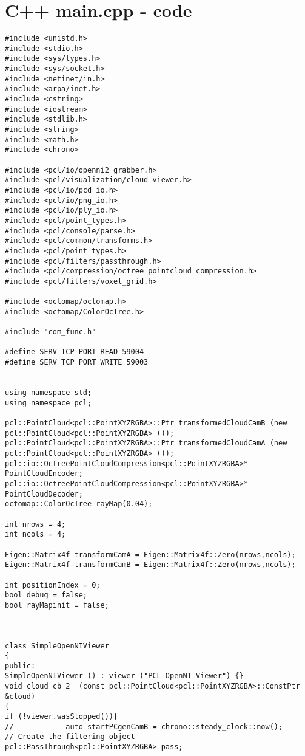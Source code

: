 \chapter{C++ main.cpp - code}
\label{app:main.cpp}


\begin{lstlisting}[frame = single, label={lst:cppread1}]
#include <unistd.h>
#include <stdio.h>
#include <sys/types.h>
#include <sys/socket.h>
#include <netinet/in.h>
#include <arpa/inet.h>
#include <cstring>
#include <iostream>
#include <stdlib.h>
#include <string>
#include <math.h>
#include <chrono>

#include <pcl/io/openni2_grabber.h>
#include <pcl/visualization/cloud_viewer.h>
#include <pcl/io/pcd_io.h>
#include <pcl/io/png_io.h>
#include <pcl/io/ply_io.h>
#include <pcl/point_types.h>
#include <pcl/console/parse.h>
#include <pcl/common/transforms.h>
#include <pcl/point_types.h>
#include <pcl/filters/passthrough.h>
#include <pcl/compression/octree_pointcloud_compression.h>
#include <pcl/filters/voxel_grid.h>

#include <octomap/octomap.h>
#include <octomap/ColorOcTree.h>

#include "com_func.h"

#define SERV_TCP_PORT_READ 59004
#define SERV_TCP_PORT_WRITE 59003


using namespace std;
using namespace pcl;

pcl::PointCloud<pcl::PointXYZRGBA>::Ptr transformedCloudCamB (new pcl::PointCloud<pcl::PointXYZRGBA> ());
pcl::PointCloud<pcl::PointXYZRGBA>::Ptr transformedCloudCamA (new pcl::PointCloud<pcl::PointXYZRGBA> ());
pcl::io::OctreePointCloudCompression<pcl::PointXYZRGBA>* PointCloudEncoder;
pcl::io::OctreePointCloudCompression<pcl::PointXYZRGBA>* PointCloudDecoder;
octomap::ColorOcTree rayMap(0.04);

int nrows = 4;
int ncols = 4;

Eigen::Matrix4f transformCamA = Eigen::Matrix4f::Zero(nrows,ncols);
Eigen::Matrix4f transformCamB = Eigen::Matrix4f::Zero(nrows,ncols);

int positionIndex = 0;
bool debug = false;
bool rayMapinit = false;



class SimpleOpenNIViewer
{
public:
SimpleOpenNIViewer () : viewer ("PCL OpenNI Viewer") {}
void cloud_cb_2_ (const pcl::PointCloud<pcl::PointXYZRGBA>::ConstPtr &cloud)
{
if (!viewer.wasStopped()){
//            auto startPCgenCamB = chrono::steady_clock::now();
// Create the filtering object
pcl::PassThrough<pcl::PointXYZRGBA> pass;


\end{lstlisting}
